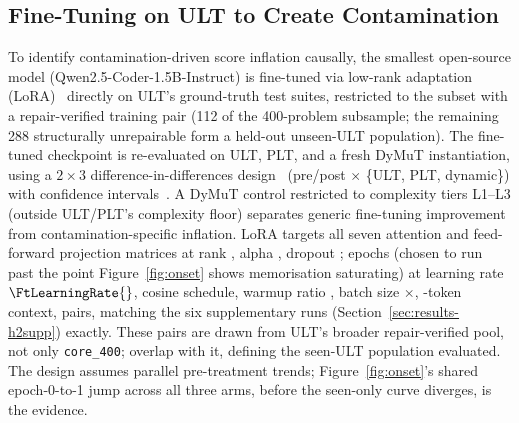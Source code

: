 \subsection{Fine-Tuning on ULT to Create Contamination}
\label{sec:methods-finetune}
To identify contamination-driven score inflation causally, the smallest open-source model (Qwen2.5-Coder-1.5B-Instruct) is fine-tuned via low-rank adaptation (LoRA)~\cite{hu2022lora} directly on ULT's ground-truth test suites, restricted to the subset with a repair-verified training pair (112 of the 400-problem subsample; the remaining 288 structurally unrepairable form a held-out unseen-ULT population). The fine-tuned checkpoint is re-evaluated on ULT, PLT, and a fresh DyMuT instantiation, using a $2{\times}3$ difference-in-differences design~\cite{angrist2009mostly} (pre/post $\times$ \{ULT, PLT, dynamic\}) with confidence intervals~\cite{efron1993bootstrap}. A DyMuT control restricted to complexity tiers L1--L3 (outside ULT/PLT's complexity floor) separates generic fine-tuning improvement from contamination-specific inflation. LoRA targets all seven attention and feed-forward projection matrices at rank \FtLoraR{}, alpha \FtLoraAlpha{}, dropout \FtLoraDropout{}; \FtEpochs{} epochs (chosen to run past the point Figure~\ref{fig:onset} shows memorisation saturating) at learning rate $\FtLearningRate{}$, cosine schedule, warmup ratio \FtWarmupRatio{}, batch size \FtPerDeviceBatch{}$\times$\FtGradAccum{}, \FtMaxLength{}-token context, \FtTrainPairs{} pairs, matching the six supplementary runs (Section~\ref{sec:results-h2supp}) exactly. These \FtTrainPairs{} pairs are drawn from ULT's broader repair-verified pool, not only \texttt{core\_400}; \HTwoSeenN{} overlap with it, defining the seen-ULT population evaluated. The design assumes parallel pre-treatment trends; Figure~\ref{fig:onset}'s shared epoch-0-to-1 jump across all three arms, before the seen-only curve diverges, is the evidence. %

